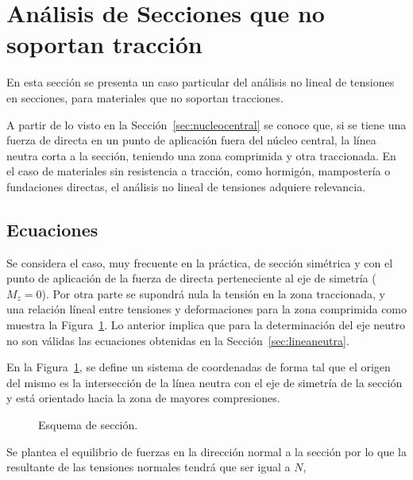 \section{Análisis de Secciones que no soportan tracción}

En esta sección se presenta un caso particular del análisis no lineal de tensiones en secciones, para materiales que no soportan tracciones.

A partir de lo visto en la Sección~\ref{sec:nucleocentral} se conoce que, si se tiene una fuerza de directa en un punto de aplicación fuera del núcleo central, la línea neutra corta a la sección, teniendo una zona comprimida y otra traccionada. %
%
En el caso de materiales sin resistencia a tracción, como hormigón,  mampostería o fundaciones directas, el análisis no lineal de tensiones adquiere relevancia. %
%

\subsection{Ecuaciones}

Se considera el caso, muy frecuente en la práctica, de sección simétrica y con el punto de aplicación de la fuerza de directa perteneciente al eje de simetría ($M_z=0$). Por otra parte se supondrá nula la tensión en la zona traccionada, y una relación líneal entre tensiones y deformaciones para la zona comprimida como muestra la Figura~\ref{fig:MNSTesquema}. Lo anterior implica que para la determinación del eje neutro no son válidas las ecuaciones obtenidas en la Sección~\ref{sec:lineaneutra}.

En la Figura~\ref{fig:MNSTesquema}, se define un sistema de coordenadas de forma tal que el origen del mismo es la intersección de la línea neutra con el eje de simetría de la sección y está orientado hacia la zona de mayores compresiones.

\begin{figure}[htb]
	\centering
{}
\hspace{0.01\textwidth}
\caption{Esquema de sección.}
	\label{fig:MNSTesquema}
\end{figure}

Se plantea el equilibrio de fuerzas en la dirección normal a la sección por lo que la resultante de las tensiones normales tendrá que ser igual a $N$,


